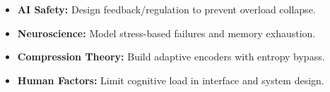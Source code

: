 \documentclass[12pt]{article}
\begin{document}
\begin{itemize}
  \item \textbf{AI Safety:} Design feedback/regulation to prevent overload collapse.
  \item \textbf{Neuroscience:} Model stress-based failures and memory exhaustion.
  \item \textbf{Compression Theory:} Build adaptive encoders with entropy bypass.
  \item \textbf{Human Factors:} Limit cognitive load in interface and system design.
\end{itemize}
\end{document}
